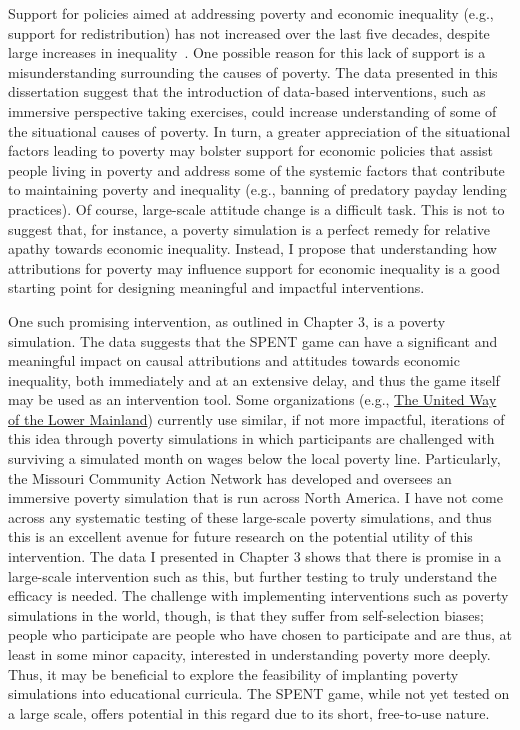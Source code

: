\documentclass{sfuthesis}
\begin{document}
Support for policies aimed at addressing poverty and economic inequality (e.g., support for redistribution) has not increased over the last five decades, despite large increases in inequality~\cite{ashok15}. One possible reason for this lack of support is a misunderstanding surrounding the causes of poverty. The data presented in this dissertation suggest that the introduction of data-based interventions, such as immersive perspective taking exercises, could increase understanding of some of the situational causes of poverty. In turn, a greater appreciation of the situational factors leading to poverty may bolster support for economic policies that assist people living in poverty and address some of the systemic factors that contribute to maintaining poverty and inequality (e.g., banning of predatory payday lending practices). Of course, large-scale attitude change is a difficult task. This is not to suggest that, for instance, a poverty simulation is a perfect remedy for relative apathy towards economic inequality. Instead, I propose that understanding how attributions for poverty may influence support for economic inequality is a good starting point for designing meaningful and impactful interventions.

One such promising intervention, as outlined in Chapter 3, is a poverty simulation. The data suggests that the SPENT game can have a significant and meaningful impact on causal attributions and attitudes towards economic inequality, both immediately and at an extensive delay, and thus the game itself may be used as an intervention tool. Some organizations (e.g., \href{http://www.makethemonth.ca/}{The United Way of the Lower Mainland}) currently use similar, if not more impactful, iterations of this idea through poverty simulations in which participants are challenged with surviving a simulated month on wages below the local poverty line. Particularly, the Missouri Community Action Network has developed and oversees an immersive poverty simulation that is run across North America. I have not come across any systematic testing of these large-scale poverty simulations, and thus this is an excellent avenue for future research on the potential utility of this intervention. The data I presented in Chapter 3 shows that there is promise in a large-scale intervention such as this, but further testing to truly understand the efficacy is needed. The challenge with implementing interventions such as poverty simulations in the world, though, is that they suffer from self-selection biases; people who participate are people who have chosen to participate and are thus, at least in some minor capacity, interested in understanding poverty more deeply. Thus, it may be beneficial to explore the feasibility of implanting poverty simulations into educational curricula. The SPENT game, while not yet tested on a large scale, offers potential in this regard due to its short, free-to-use nature.
	
\end{document}

